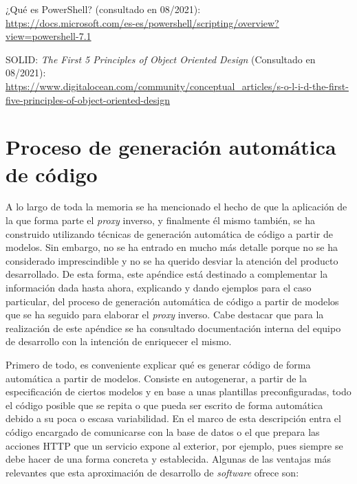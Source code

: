 \documentclass[11pt,spanish,listoffigures]{tfgetsinf}
\begin{document}
\begin{thebibliography}{10}
¿Qué es PowerShell? (consultado en 08/2021):\\
\url{https://docs.microsoft.com/es-es/powershell/scripting/overview?view=powershell-7.1}

SOLID: \emph{The First 5 Principles of Object Oriented Design} (Consultado en 08/2021):\\
\url{https://www.digitalocean.com/community/conceptual_articles/s-o-l-i-d-the-first-five-principles-of-object-oriented-design}

\end{thebibliography}


\APPENDIX

\chapter{Proceso de generación automática de código} \label{generacionDeCodigo}

A lo largo de toda la memoria se ha mencionado el hecho de que la aplicación de la que forma parte el \emph{proxy} inverso, y finalmente él mismo también, se ha construido utilizando técnicas de generación automática de código a partir de modelos. Sin embargo, no se ha entrado en mucho más detalle porque no se ha considerado imprescindible y no se ha querido desviar la atención del producto desarrollado. De esta forma, este apéndice está destinado a complementar la información dada hasta ahora, explicando y dando ejemplos para el caso particular, del proceso de generación automática de código a partir de modelos que se ha seguido para elaborar el \emph{proxy} inverso. Cabe destacar que para la realización de este apéndice se ha consultado documentación interna del equipo de desarrollo con la intención de enriquecer el mismo.

Primero de todo, es conveniente explicar qué es generar código de forma automática a partir de modelos. Consiste en autogenerar, a partir de la especificación de ciertos modelos y en base a unas plantillas preconfiguradas, todo el código posible que se repita o que pueda ser escrito de forma automática debido a su poca o escasa variabilidad. En el marco de esta descripción entra el código encargado de comunicarse con la base de datos o el que prepara las acciones HTTP que un servicio expone al exterior, por ejemplo, pues siempre se debe hacer de una forma concreta y establecida. Algunas de las ventajas más relevantes que esta aproximación de desarrollo de \emph{software} ofrece son:
\end{document}
